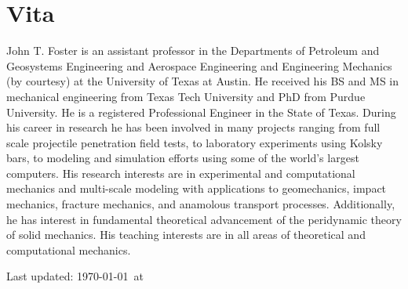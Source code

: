 \documentclass[12pt,letterpaper]{article}
\def\HCode#1{}
\begin{document}
\HCode{<a name="journalpapers"></a>}











%

\ifdefined\ispdf
\newpage
\section*{Vita}
John T. Foster is an assistant professor in the Departments of Petroleum and Geosystems Engineering and Aerospace Engineering and Engineering Mechanics (by courtesy) at the University of Texas at Austin. He received his BS and MS in mechanical engineering from Texas Tech University and PhD from Purdue University. He is a registered Professional Engineer in the State of Texas. During his career in research he has been involved in many projects ranging from full scale projectile penetration field tests, to laboratory experiments using Kolsky bars, to modeling and simulation efforts using some of the world's largest computers. His research interests are in experimental and computational mechanics and multi-scale modeling with applications to geomechanics, impact mechanics, fracture mechanics, and anamolous transport processes. Additionally, he has interest in fundamental theoretical advancement of the peridynamic theory of solid mechanics. His teaching interests are in all areas of theoretical and computational mechanics.
\else
\fi

\vfill 
\HCode{<center>}
\begin{center}
    \begin{small}
        Last updated: \today\ at \currenttime
    \end{small}
\end{center}
\HCode{</center>}


%

\HCode{</div>} %
\HCode{</div>} %
\HCode{</div>} %
\end{document}
